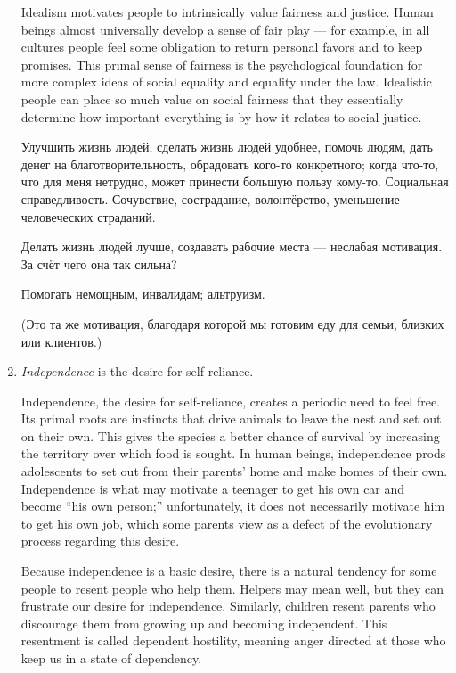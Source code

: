 \documentclass[11pt]{article}
\theoremstyle{remark}
\theoremstyle{definition}
\begin{document}
\begin{enumerate}
Idealism motivates people to intrinsically value fairness and justice. Human beings almost universally develop a sense of fair play --- for example, in all cultures people feel some obligation to return personal favors and to keep promises. This primal sense of fairness is the psychological foundation for more complex ideas of social equality and equality under the law. Idealistic people can place so much value on social fairness that they essentially determine how important everything is by how it relates to social justice.

Улучшить жизнь людей, сделать жизнь людей удобнее, помочь людям, дать денег на благотворительность, обрадовать кого-то конкретного; когда что-то, что для меня нетрудно, может принести большую пользу кому-то. Социальная справедливость. Сочувствие, сострадание, волонтёрство, уменьшение человеческих страданий. 

Делать жизнь людей лучше, создавать рабочие места --- неслабая мотивация. За счёт чего она так сильна?

Помогать немощным, инвалидам; альтруизм.

(Это та же мотивация, благодаря которой мы готовим еду для семьи, близких или клиентов.)





\item \textit{Independence} is the desire for self-reliance. 





Independence, the desire for self-reliance, creates a periodic need to feel free. Its primal roots are instincts that drive animals to leave the nest and set out on their own. This gives the species a better chance of survival by increasing the territory over which food is sought. In human beings, independence prods adolescents to set out from their parents’ home and make homes of their own. Independence is what may motivate a teenager to get his own car and become “his own person;” unfortunately, it does not necessarily motivate him to get his own job, which some parents view as a defect of the evolutionary process regarding this desire.

Because independence is a basic desire, there is a natural tendency for some people to resent people who help them. Helpers may mean well, but they can frustrate our desire for independence. Similarly, children resent parents who discourage them from growing up and becoming independent. This resentment is called dependent hostility, meaning anger directed at those who keep us in a state of dependency.


\end{enumerate}
\end{document}

